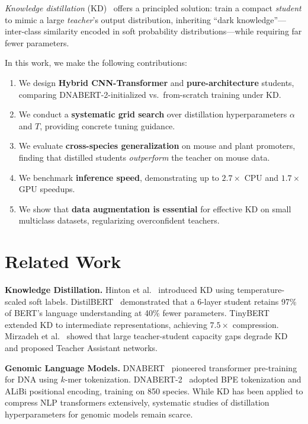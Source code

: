 \documentclass{article}
\begin{document}
\emph{Knowledge distillation} (KD)~\cite{hinton2015distilling} offers a principled solution: train a compact \emph{student} to mimic a large \emph{teacher}'s output distribution, inheriting ``dark knowledge''---inter-class similarity encoded in soft probability distributions---while requiring far fewer parameters.

In this work, we make the following contributions:
\begin{enumerate}
    \item We design \textbf{Hybrid CNN-Transformer} and \textbf{pure-architecture} students, comparing DNABERT-2-initialized vs.\ from-scratch training under KD.
    \item We conduct a \textbf{systematic grid search} over distillation hyperparameters $\alpha$ and $T$, providing concrete tuning guidance.
    \item We evaluate \textbf{cross-species generalization} on mouse and plant promoters, finding that distilled students \emph{outperform} the teacher on mouse data.
    \item We benchmark \textbf{inference speed}, demonstrating up to $2.7\times$ CPU and $1.7\times$ GPU speedups.
    \item We show that \textbf{data augmentation is essential} for effective KD on small multiclass datasets, regularizing overconfident teachers.
\end{enumerate}

\section{Related Work}
\label{sec:related}

\textbf{Knowledge Distillation.}\quad
Hinton et al.~\cite{hinton2015distilling} introduced KD using temperature-scaled soft labels.
DistilBERT~\cite{sanh2019distilbert} demonstrated that a 6-layer student retains 97\% of BERT's language understanding at 40\% fewer parameters.
TinyBERT~\cite{jiao2020tinybert} extended KD to intermediate representations, achieving $7.5\times$ compression.
Mirzadeh et al.~\cite{mirzadeh2020improved} showed that large teacher-student capacity gaps degrade KD and proposed Teacher Assistant networks.

\textbf{Genomic Language Models.}\quad
DNABERT~\cite{ji2021dnabert} pioneered transformer pre-training for DNA using $k$-mer tokenization.
DNABERT-2~\cite{zhou2023dnabert2} adopted BPE tokenization and ALiBi positional encoding, training on 850 species.
While KD has been applied to compress NLP transformers extensively, systematic studies of distillation hyperparameters for genomic models remain scarce.
\end{document}
